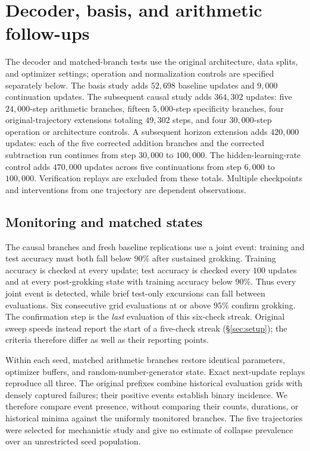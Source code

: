 \section{Decoder, basis, and arithmetic follow-ups}
\label{app:followup}

The decoder and matched-branch tests use the original architecture, data splits, and optimizer settings; operation and normalization controls are specified separately below. The basis study adds $52{,}698$ baseline updates and $9{,}000$ continuation updates. The subsequent causal study adds $364{,}302$ updates: five $24{,}000$-step arithmetic branches, fifteen $5{,}000$-step specificity branches, four original-trajectory extensions totaling $49{,}302$ steps, and four $30{,}000$-step operation or architecture controls. A subsequent horizon extension adds $420{,}000$ updates: each of the five corrected addition branches and the corrected subtraction run continues from step $30{,}000$ to $100{,}000$. The hidden-learning-rate control adds $470{,}000$ updates across five continuations from step $6{,}000$ to $100{,}000$. Verification replays are excluded from these totals. Multiple checkpoints and interventions from one trajectory are dependent observations.

\subsection{Monitoring and matched states}
\label{app:followup-protocol}

The causal branches and fresh baseline replications use a joint event: training and test accuracy must both fall below $90\%$ after sustained grokking. Training accuracy is checked at every update; test accuracy is checked every $100$ updates and at every post-grokking state with training accuracy below $90\%$. Thus every joint event is detected, while brief test-only excursions can fall between evaluations. Six consecutive grid evaluations at or above $95\%$ confirm grokking. The confirmation step is the \emph{last} evaluation of this six-check streak. Original sweep speeds instead report the start of a five-check streak (\S\ref{sec:setup}); the criteria therefore differ as well as their reporting points.

Within each seed, matched arithmetic branches restore identical parameters, optimizer buffers, and random-number-generator state. Exact next-update replays reproduce all three. The original prefixes combine historical evaluation grids with densely captured failures; their positive events establish binary incidence. We therefore compare event presence, without comparing their counts, durations, or historical minima against the uniformly monitored branches. The five trajectories were selected for mechanistic study and give no estimate of collapse prevalence over an unrestricted seed population.

